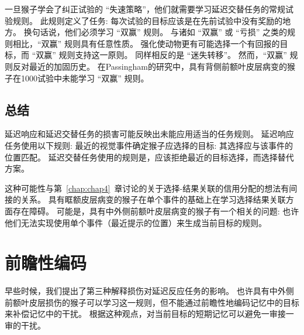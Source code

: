 一旦猴子学会了纠正试验的 “失速策略”，他们就需要学习延迟交替任务的常规试验规则。
此规则定义了任务: 每次试验的目标应该是在先前试验中没有奖励的地方。
换句话说，他们必须学习 “双赢” 规则。
与诸如 “双赢” 或 “亏损” 之类的规则相比，“双赢” 规则具有任意性质。
强化使动物更有可能选择一个有回报的目标，而 “双赢” 规则支持这一原则。
同样相反的是 “迷失转移”。
然而，“双赢” 规则反对最近的加固历史。
在Passingham\cite{passingham1975delayed}的研究中，具有背侧前额叶皮层病变的猴子在1000试验中未能学习 “双赢” 规则。


\subsection{总结}

延迟响应和延迟交替任务的损害可能反映出未能应用适当的任务规则。
延迟响应任务使用以下规则: 最近的视觉事件确定猴子应选择的目标: 
其选择应与该事件的位置匹配。
延迟交替任务使用的规则是，应该拒绝最近的目标选择，而选择替代方案。


这种可能性与第~\ref{chap:chap4}~章讨论的关于选择-结果关联的信用分配的想法有间接的关系。
具有眶额皮层病变的猴子在单个事件的基础上在学习选择结果关联方面存在障碍。
可能是，具有中外侧前额叶皮层病变的猴子有一个相关的问题: 
也许他们无法实现使用单个事件（最近提示的位置）来生成当前目标的规则。



\section{前瞻性编码}

早些时候，我们提出了第三种解释损伤对延迟反应任务的影响。
也许具有中外侧前额叶皮层损伤的猴子可以学习这一规则，但不能通过前瞻性地编码记忆中的目标来补偿记忆中的干扰。
根据这种观点，对当前目标的短期记忆可以避免一审接一审的干扰。


